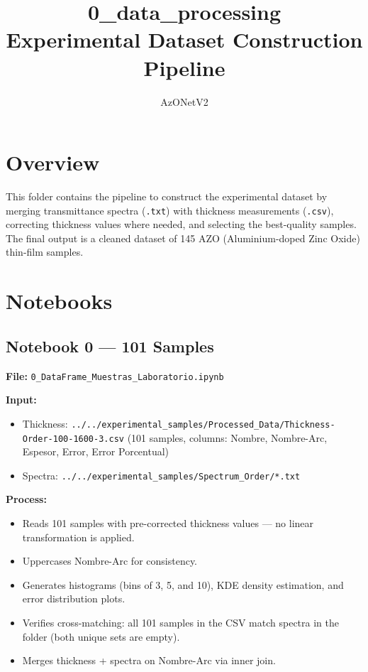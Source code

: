\documentclass[11pt,a4paper]{article}
\title{\textbf{0\_data\_processing} \\ Experimental Dataset Construction Pipeline}
\author{AzONetV2}
\date{}
\begin{document}
\maketitle

\section{Overview}

This folder contains the pipeline to construct the experimental dataset by merging transmittance spectra ({\tt .txt}) with thickness measurements ({\tt .csv}), correcting thickness values where needed, and selecting the best-quality samples. The final output is a cleaned dataset of 145 AZO (Aluminium-doped Zinc Oxide) thin-film samples.

\section{Notebooks}

\subsection{Notebook 0 --- 101 Samples}
\textbf{File:} {\tt 0\_DataFrame\_Muestras\_Laboratorio.ipynb}

\textbf{Input:}
\begin{itemize}
    \item Thickness: {\tt ../../experimental\_samples/Processed\_Data/Thickness-Order-100-1600-3.csv} (101 samples, columns: Nombre, Nombre-Arc, Espesor, Error, Error Porcentual)
    \item Spectra: {\tt ../../experimental\_samples/Spectrum\_Order/*.txt}
\end{itemize}

\textbf{Process:}
\begin{itemize}
    \item Reads 101 samples with pre-corrected thickness values --- no linear transformation is applied.
    \item Uppercases Nombre-Arc for consistency.
    \item Generates histograms (bins of 3, 5, and 10), KDE density estimation, and error distribution plots.
    \item Verifies cross-matching: all 101 samples in the CSV match spectra in the folder (both unique sets are empty).
    \item Merges thickness + spectra on Nombre-Arc via inner join.
\end{itemize}
\end{document}
